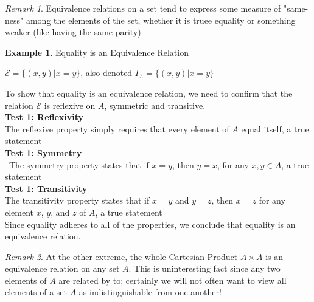 \documentclass{book}
\theoremstyle{definition}
\newtheorem{example}{Example}[definition]
\theoremstyle{remark}
\newtheorem{remark}{Remark}
\newcommand{\cc}[1]{\mathcal{#1}}
\begin{document}
    \begin{remark}
        Equivalence relations on a set tend to express some measure of "same-ness" among the elements of the set, whether it is truee equality or something weaker (like having the same parity)
    \end{remark}
    
    
    
    \begin{example}
    Equality is an Equivalence Relation \\
    
        \begin{center}
            $\cc{E} = \{ (x,y) | x=y\}$, also denoted $I_A = \{ (x,y) | x=y\}$
        \end{center}
    
        To show that equality is an equivalence relation, we need to confirm that the relation $\cc{E}$ is reflexive on $A$, symmetric and transitive. \\
        
            \textbf{Test 1: Reflexivity } \\
                The reflexive property simply requires that every element of $A$ equal itself, a true statement \\
            \textbf{Test 1: Symmetry } \\
            \   The symmetry property states that if $x=y$, then $y=x$, for any $x,y \in A$, a true statement \\
            \textbf{Test 1: Transitivity } \\
                The transitivity property states that if $x=y$ and $y=z$, then $x=z$ for any element $x$, $y$, and $z$ of $A$, a true statement \\
                
        Since equality adheres to all of the properties, we conclude that equality is an equivalence relation. 
    \end{example}
    
    \begin{remark}
        At the other extreme, the whole Cartesian Product $A \times A$ is an equivalence relation on any set $A$. This is uninteresting fact since any two elements of $A$ are related by to; certainly we will not often want to view all elements of a set $A$ as indistinguishable from one another!\textbf{}
    \end{remark}
    
\end{document}
